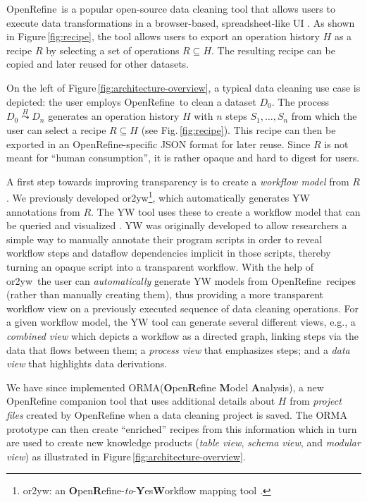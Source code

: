 \documentclass[conference]{ijdc-v14}
\newcommand{\Figref}[1]{Figure\,\ref{#1}}
\newcommand{\figref}[1]{Fig.\,\ref{#1}}
\newcommand{\ortoyw}{\textsf{or2yw}\xspace}
\newcommand{\orma}{\textsf{ORMA}\xspace}  %
\newcommand{\openrefine}{\textrm{OpenRefine}\xspace}
\newcommand{\yw}{\textsf{YW}\xspace}
\begin{document}
\openrefine\ is a popular open-source data cleaning tool that allows users to execute data
transformations in a browser-based, spreadsheet-like UI \cite{openrefine2020}.  As shown in
\Figref{fig:recipe}, the tool allows users to export an operation history $H$ as a recipe $R$ by
selecting a set of operations $R\subseteq H$. The resulting recipe can be copied and later reused
for other datasets. 


On the left of \Figref{fig:architecture-overview}, a typical data cleaning use case is depicted: the
user employs \openrefine\ to clean a dataset $D_0$. The process $D_0\stackrel{H}{\leadsto}D_n$
generates an operation history $H$ with $n$ steps $S_1,\dots, S_n$ from which the user can select a
recipe $R\subseteq H$ (see \figref{fig:recipe}). This recipe can then be exported in an \openrefine-specific JSON format for
later reuse. %
Since $R$ is not meant for ``human consumption'', it is rather opaque and hard to digest for users.

A first step towards improving transparency is to create a \emph{workflow model} from $R$. We 
previously developed \ortoyw\footnote{\ortoyw: an
  \textbf{O}pen\textbf{R}efine-\emph{to}-\textbf{Y}es\textbf{W}orkflow
  mapping tool \cite{or2yw}.}, which automatically generates \yw annotations from $R$. The \yw tool
uses these to create a workflow model that can be queried and visualized
\cite{mcphillips2015yesworkflow}. \yw was originally developed to allow researchers a simple way to
manually annotate their program scripts in order to reveal workflow steps and dataflow dependencies
implicit in those scripts, thereby turning an opaque script into a transparent workflow. With the
help of \ortoyw\ the user can \emph{automatically} generate \yw models from \openrefine\ recipes
(rather than manually creating them), thus providing a more {transparent workflow view} on a
previously executed sequence of data cleaning operations. For a given workflow model, the \yw tool
can generate several different views,
 e.g., a \emph{combined view} which depicts a workflow as a directed graph, linking steps via the
 data that flows between them; a \emph{process view} that emphasizes steps; and a \emph{data
   view} that highlights data derivations.

 We have since implemented \orma (\textbf{O}pen\textbf{R}efine \textbf{M}odel \textbf{A}nalysis), a
 new \openrefine companion tool that uses additional details about $H$ from \emph{project files}
 created by \openrefine when a data cleaning project is saved. The \orma prototype can then create
 ``enriched'' recipes from this information which in turn are used to create new knowledge products
 (\emph{table view}, \emph{schema view}, and \emph{modular view}) as illustrated in
 \Figref{fig:architecture-overview}.
\end{document}
